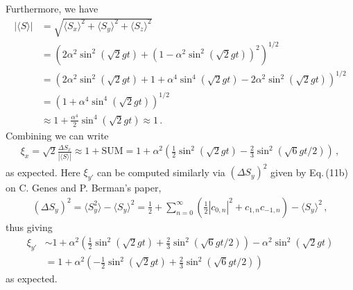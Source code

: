 \documentclass[11pt, oneside]{book}
\theoremstyle{break}
\theoremstyle{break}
\begin{document}
Furthermore, we have
\begin{align*}
|\langle S\rangle| 
&= \sqrt{\langle S_x\rangle^2 + \langle S_y\rangle^2 + \langle S_z\rangle^2}\\
&=\left( 2\alpha^2 \sin^2(\sqrt{2}gt) + \left(1 -\alpha^2 \sin^2(\sqrt{2}gt)\right)^2 \right)^{1/2}\\
&=\left( 2\alpha^2 \sin^2(\sqrt{2}gt) + 1 + \alpha^4 \sin^4(\sqrt{2}gt)- 2\alpha^2\sin^2(\sqrt{2}gt)\right)^{1/2} \\
&= \left( 1 + \alpha^4 \sin^4(\sqrt{2}gt) \right)^{1/2}\\
&\approx 1 + \frac{\alpha^4}{2}\sin^4(\sqrt{2}gt) \approx 1\,.
\end{align*}
Combining we can write
\begin{align*}
\xi_x = \sqrt{2}\frac{\Delta S_x}{|\langle S\rangle|} \approx 1+ \text{SUM} =1+ \alpha^2\left( \frac{1}{2}\sin^2(\sqrt{2}gt) -\frac{2}{3}\sin^2(\sqrt{6}gt/2)\right)\,,
\end{align*}
as expected. Here $\xi_{y'}$ can be computed similarly via $(\Delta S_y)^2$ given by Eq.\,(11b) on C. Genes and P. Berman's paper,
\begin{align*}
(\Delta S_y)^2 = \langle S_y^2\rangle - \langle S_y\rangle^2 = \frac{1}{2}+ \sum_{n=0}^\infty \left( \frac{1}{2}|c_{0,n}|^2 + c_{1,n}c_{-1,n}\right) - \langle S_y\rangle^2\,,
\end{align*}
thus giving
\begin{align*}
\xi_{y'} &\sim 1 + \alpha^2\left( \frac{1}{2}\sin^2(\sqrt{2}gt) +\frac{2}{3}\sin^2(\sqrt{6}gt/2)\right) - \alpha^2 \sin^2(\sqrt{2}gt) \\
&=1+\alpha^2 \left(- \frac{1}{2}\sin^2(\sqrt{2}gt) +\frac{2}{3}\sin^2(\sqrt{6}gt/2)\right)
\end{align*}
as expected. 
\end{document}
